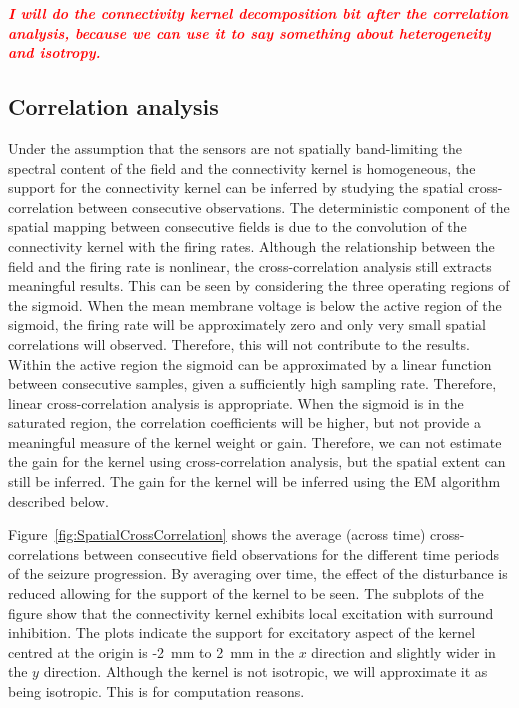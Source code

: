 \documentclass[]{article}
\newcommand{\dean}[1]{\textsf{\emph{\textbf{\textcolor{red}{#1}}}}}
\begin{document}
\dean{I will do the connectivity kernel decomposition bit after the correlation analysis, because we can use it to say something about heterogeneity and isotropy.}

\subsection{Correlation analysis}\label{subsec:CorrAnal}
Under the assumption that the sensors are not spatially band-limiting the spectral content of the field and the connectivity kernel is homogeneous, the support for the connectivity kernel can be inferred by studying the spatial cross-correlation between consecutive observations. The deterministic component of the spatial mapping between consecutive fields is due to the convolution of the connectivity kernel with the firing rates. Although the relationship between the field and the firing rate is nonlinear, the cross-correlation analysis still extracts meaningful results. This can be seen by considering the three operating regions of the sigmoid. When the mean membrane voltage is below the active region of the sigmoid, the firing rate will be approximately zero and only very small spatial correlations will observed. Therefore, this will not contribute to the results. Within the active region the sigmoid can be approximated by a linear function between consecutive samples, given a sufficiently high sampling rate. Therefore, linear cross-correlation analysis is appropriate. When the sigmoid is in the saturated region, the correlation coefficients will be higher, but not provide a meaningful measure of the kernel weight or gain. Therefore, we can not estimate the gain for the kernel using cross-correlation analysis, but the spatial extent can still be inferred. The gain for the kernel will be inferred using the EM algorithm described below.

Figure~\ref{fig:SpatialCrossCorrelation} shows the average (across time) cross-correlations between consecutive field observations for the different time periods of the seizure progression. By averaging over time, the effect of the disturbance is reduced allowing for the support of the kernel to be seen. The subplots of the figure show that the connectivity kernel exhibits local excitation with surround inhibition. The plots indicate the support for excitatory aspect of the kernel centred at the origin is -2~mm to 2~mm in the $x$ direction and slightly wider in the $y$ direction. Although the kernel is not isotropic, we will approximate it as being isotropic. This is for computation reasons.
\end{document}
